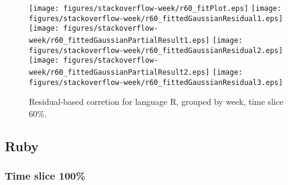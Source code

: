 \begin{figure}[hb]
\centering
{}
{\texttt{[image: figures/stackoverflow-week/r60\_fitPlot.eps]}}
{\texttt{[image: figures/stackoverflow-week/r60\_fittedGaussianResidual1.eps]}}
{\texttt{[image: figures/stackoverflow-week/r60\_fittedGaussianPartialResult1.eps]}}
{\texttt{[image: figures/stackoverflow-week/r60\_fittedGaussianResidual2.eps]}}
{\texttt{[image: figures/stackoverflow-week/r60\_fittedGaussianPartialResult2.eps]}}
{\texttt{[image: figures/stackoverflow-week/r60\_fittedGaussianResidual3.eps]}}
\caption{Residual-based corretion for language R, grouped by week, time slice 60\%.}
\end{figure}


\clearpage 
\newpage 


\subsection{Ruby}

\FloatBarrier

\subsubsection{Time slice 100\%}


